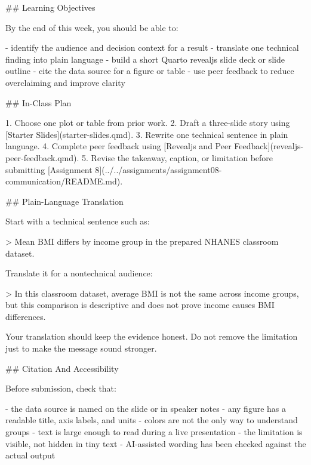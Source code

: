 \documentclass[
  letterpaper,
  DIV=11,
  numbers=noendperiod,
  oneside]{scrreprt}
\newenvironment{Shaded}{\begin{snugshade}}{\end{snugshade}}
\newcommand{\AttributeTok}[1]{\textcolor[rgb]{0.40,0.45,0.13}{#1}}
\newcommand{\CommentTok}[1]{\textcolor[rgb]{0.37,0.37,0.37}{#1}}
\newcommand{\FunctionTok}[1]{\textcolor[rgb]{0.28,0.35,0.67}{#1}}
\newcommand{\NormalTok}[1]{\textcolor[rgb]{0.00,0.23,0.31}{#1}}
\newcommand{\OtherTok}[1]{\textcolor[rgb]{0.00,0.23,0.31}{#1}}
\newcommand{\SpecialStringTok}[1]{\textcolor[rgb]{0.13,0.47,0.30}{#1}}
\begin{document}
\begin{Shaded}
\begin{Highlighting}[numbers=left,,]
\FunctionTok{\#\# Learning Objectives}

\NormalTok{By the end of this week, you should be able to:}

\SpecialStringTok{{-} }\NormalTok{identify the audience and decision context for a result}
\SpecialStringTok{{-} }\NormalTok{translate one technical finding into plain language}
\SpecialStringTok{{-} }\NormalTok{build a short Quarto revealjs slide deck or slide outline}
\SpecialStringTok{{-} }\NormalTok{cite the data source for a figure or table}
\SpecialStringTok{{-} }\NormalTok{use peer feedback to reduce overclaiming and improve clarity}

\FunctionTok{\#\# In{-}Class Plan}

\SpecialStringTok{1. }\NormalTok{Choose one plot or table from prior work.}
\SpecialStringTok{2. }\NormalTok{Draft a three{-}slide story using }\CommentTok{[}\OtherTok{Starter Slides}\CommentTok{](starter{-}slides.qmd)}\NormalTok{.}
\SpecialStringTok{3. }\NormalTok{Rewrite one technical sentence in plain language.}
\SpecialStringTok{4. }\NormalTok{Complete peer feedback using }\CommentTok{[}\OtherTok{Revealjs and Peer Feedback}\CommentTok{](revealjs{-}peer{-}feedback.qmd)}\NormalTok{.}
\SpecialStringTok{5. }\NormalTok{Revise the takeaway, caption, or limitation before submitting }\CommentTok{[}\OtherTok{Assignment 8}\CommentTok{](../../assignments/assignment08{-}communication/README.md)}\NormalTok{.}

\FunctionTok{\#\# Plain{-}Language Translation}

\NormalTok{Start with a technical sentence such as:}

\AttributeTok{\textgreater{} Mean BMI differs by income group in the prepared NHANES classroom dataset.}

\NormalTok{Translate it for a nontechnical audience:}

\AttributeTok{\textgreater{} In this classroom dataset, average BMI is not the same across income groups, but this comparison is descriptive and does not prove income causes BMI differences.}

\NormalTok{Your translation should keep the evidence honest. Do not remove the limitation just to make the message sound stronger.}

\FunctionTok{\#\# Citation And Accessibility}

\NormalTok{Before submission, check that:}

\SpecialStringTok{{-} }\NormalTok{the data source is named on the slide or in speaker notes}
\SpecialStringTok{{-} }\NormalTok{any figure has a readable title, axis labels, and units}
\SpecialStringTok{{-} }\NormalTok{colors are not the only way to understand groups}
\SpecialStringTok{{-} }\NormalTok{text is large enough to read during a live presentation}
\SpecialStringTok{{-} }\NormalTok{the limitation is visible, not hidden in tiny text}
\SpecialStringTok{{-} }\NormalTok{AI{-}assisted wording has been checked against the actual output}


\end{Highlighting}
\end{Shaded}
\end{document}
